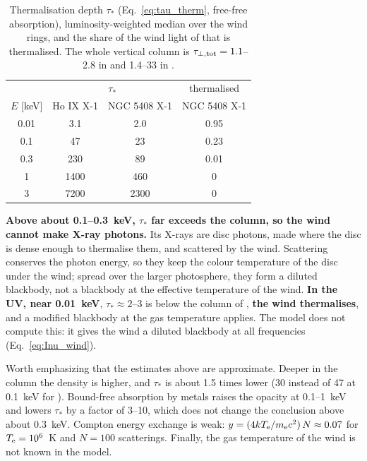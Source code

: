 \begin{table}
\centering
\caption{Thermalisation depth $\tau_*$ (Eq.~\ref{eq:tau_therm}, free-free absorption), luminosity-weighted median over the wind rings, and the share of the wind light of \srcNGCfiftyfour that is thermalised. The whole vertical column is $\tau_{\perp,{\rm tot}} = 1.1$--$2.8$ in \srcHoIX and 1.4--33 in \srcNGCfiftyfour.}
\label{tab:therm}
\small
\setlength{\tabcolsep}{3pt}
\begin{tabular}{@{}cccc@{}}
\toprule
& \multicolumn{2}{c}{$\tau_*$} & thermalised \\
$E$ [keV] & Ho IX X-1 & NGC 5408 X-1 & NGC 5408 X-1 \\
\midrule
0.01 & 3.1 & 2.0 & 0.95 \\
0.1 & 47 & 23 & 0.23 \\
0.3 & 230 & 89 & 0.01 \\
1 & 1400 & 460 & 0 \\
3 & 7200 & 2300 & 0 \\
\bottomrule
\end{tabular}
\end{table}

\textbf{Above about 0.1--0.3~keV, $\tau_*$ far exceeds the column, so the wind cannot make X-ray photons.}
Its X-rays are disc photons, made where the disc is dense enough to thermalise them, and scattered by the wind.
Scattering conserves the photon energy, so they keep the colour temperature of the disc under the wind; spread over the larger photosphere, they form a diluted blackbody, not a blackbody at the effective temperature of the wind.
\textbf{In the UV, near 0.01~keV}, $\tau_* \approx 2$--$3$ is below the column of \srcNGCfiftyfour, \textbf{the wind thermalises}, and a modified blackbody at the gas temperature applies.
The model does not compute this: it gives the wind a diluted blackbody at all frequencies (Eq.~\ref{eq:Inu_wind}).

Worth emphasizing that the  estimates above are approximate. 
Deeper in the column the density is higher, and $\tau_*$ is about 1.5 times lower (30 instead of 47 at 0.1~keV for \srcHoIX).
Bound-free absorption by metals raises the opacity at 0.1--1~keV and lowers $\tau_*$ by a factor of 3--10, which does not change the conclusion above about 0.3~keV.
Compton energy exchange is weak: $y = (4kT_{\rm e}/m_{\rm e}c^2)\,N \approx 0.07$ for $T_{\rm e} = 10^6$~K and $N = 100$ scatterings.
Finally, the gas temperature of the wind is not known in the model.


